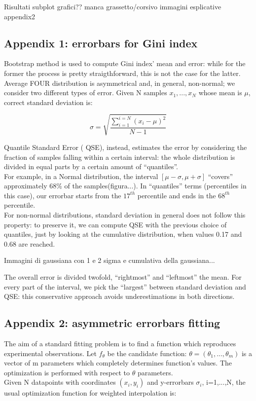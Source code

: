
Risultati
subplot grafici??
manca grassetto/corsivo
immagini esplicative appendix2


\subsection{Appendix 1: errorbars for Gini index}

Bootstrap method is used to compute Gini index' mean and error: while for the former the process is pretty straigthforward, this is not the case for the latter.
Average FOUR distribution is asymmetrical and, in general, non-normal; we consider two different types of error.
Given N samples ${x_1,...,x_N}$ whose mean is $\mu$, correct standard deviation is:

$$
\sigma=\sqrt{\frac{\sum_{i=1}^{i=N}(x_i - \mu)^2}{N-1}}
$$


Quantile Standard Error (	QSE), instead, estimates the error by considering the fraction of samples falling within a certain interval: the whole distribution is divided in equal parts by a certain amount of ``quantiles''.\\
For example, in a Normal distribution, the interval $[\mu -\sigma, \mu +\sigma]$ ``covers'' approximately 68\% of the samples(figura...).
In ``quantiles'' terms (percentiles in this case), our errorbar starts from the $17^{th}$ percentile and ends in the $68^{th}$ percentile.\\
For non-normal distributions, standard deviation in general does not follow this property: to preserve it, we can compute QSE with the previous choice of quantiles, just by looking at the cumulative distribution, when values 0.17 and 0.68 are reached.

Immagini di gaussiana con 1 e 2 sigma e cumulativa della gaussiana...

The overall error is divided twofold, ``rightmost'' and ``leftmost''  the mean. For every part of the interval, we pick the ``largest'' between standard deviation and QSE: this conservative approach avoids underestimations in both directions.




\subsection{Appendix 2: asymmetric errorbars fitting}
The aim of a standard fitting problem is to find a function which reproduces experimental observations.
Let $f_{\theta}$ be the candidate function: $\theta=(\theta_1,...,\theta_m)$ is a vector of m parameters which completely determines function's values.
The optimization is performed with respect to $\theta$ parameters.\\
Given N datapoints with coordinates ${(x_i,y_i)}$ and y-errorbars $\sigma_i$, i=1,...,N, the usual optimization function for weighted interpolation is:

